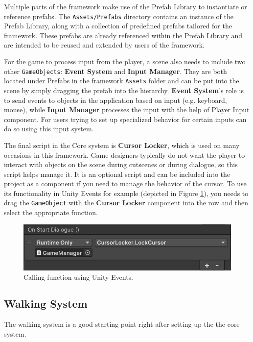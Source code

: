 Multiple parts of the framework make use of the Prefab Library to instantiate or reference prefabs. The \verb|Assets/Prefabs| directory contains an instance of the Prefab Library, along with a collection of predefined prefabs tailored for the framework. These prefabs are already referenced within the Prefab Library and are intended to be reused and extended by users of the framework.

For the game to process input from the player, a scene also needs to include two other \verb|GameObjects|: \textbf{Event System} and \textbf{Input Manager}. They are both located under Prefabs in the framework \verb|Assets| folder and can be put into the scene by simply dragging the prefab into the hierarchy. \textbf{Event System}'s role is to send events to objects in the application based on input (e.g. keyboard, mouse), while \textbf{Input Manager} processes the input with the help of Player Input component. For users trying to set up specialized behavior for certain inputs can do so using this input system.

The final script in the Core system is \textbf{Cursor Locker}, which is used on many occasions in this framework. Game designers typically do not want the player to interact with objects on the scene during cutscenes or during dialogue, so this script helps manage it. It is an optional script and can be included into the project as a component if you need to manage the behavior of the cursor. To use its functionality in Unity Events for example (depicted in Figure \ref{fig:Manual-UnityEvents}), you needs to drag the \verb|GameObject| with the \textbf{Cursor Locker} component into the row and then select the appropriate function.


\begin{figure}[H]
\centering
\includegraphics[width=0.7\linewidth]{img/User doc/image_2025-07-09_124713377.png}
\caption{Calling function using Unity Events.}
\label{fig:Manual-UnityEvents}
\end{figure}


\subsection{Walking System}
\label{Manual:WS}
The walking system is a good starting point right after setting up the the core system. 

